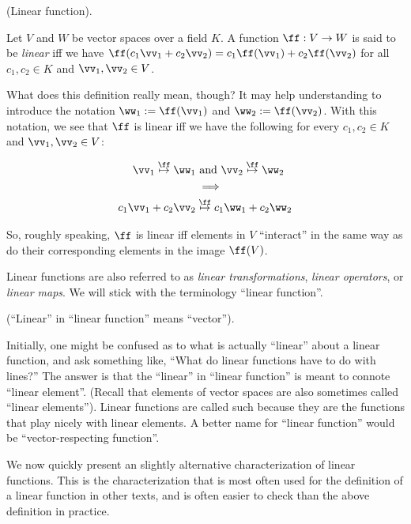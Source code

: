 \begin{defn}
\label{ch::lin_alg::defn::linear_function_intuitive}
    (Linear function). 
    
    Let $V$ and $W$ be vector spaces over a field $K$. A function $\ff:V \rightarrow W$ is said to be \textit{linear} iff we have $\ff(c_1 \vv_1 + c_2 \vv_2) = c_1 \ff(\vv_1) + c_2 \ff(\vv_2)$ for all $c_1, c_2 \in K$ and $\vv_1, \vv_2 \in V$.
    
    What does this definition really mean, though? It may help understanding to introduce the notation $\ww_1 := \ff(\vv_1)$ and $\ww_2 := \ff(\vv_2)$. With this notation, we see that $\ff$ is linear iff we have the following for every $c_1, c_2 \in K$ and $\vv_1, \vv_2 \in V$:
    
    \begin{align*}
        \vv_1 \overset{\ff}{\mapsto} \ww_1 &\text{ and } \vv_2 \overset{\ff}{\mapsto} \ww_2 \\
        &\implies \\
        c_1 \vv_1 + c_2 \vv_2 &\overset{\ff}{\mapsto} c_1 \ww_1 + c_2 \ww_2
    \end{align*}
    
    So, roughly speaking, $\ff$ is linear iff elements in $V$ ``interact'' in the same way as do their corresponding elements in the image $\ff(V)$.
    
    Linear functions are also referred to as \textit{linear transformations}, \textit{linear operators}, or \textit{linear maps}. We will stick with the terminology ``linear function''.
\end{defn}

\begin{remark}
    (``Linear'' in ``linear function'' means ``vector'').
    
    Initially, one might be confused as to what is actually ``linear'' about a linear function, and ask something like, ``What do linear functions have to do with lines?'' The answer is that the ``linear'' in ``linear function'' is meant to connote ``linear element''. (Recall that elements of vector spaces are also sometimes called ``linear elements''). Linear functions are called such because they are the functions that play nicely with linear elements. A better name for ``linear function'' would be ``vector-respecting function''.
\end{remark}

We now quickly present an slightly alternative characterization of linear functions. This is the characterization that is most often used for the definition of a linear function in other texts, and is often easier to check than the above definition in practice.


